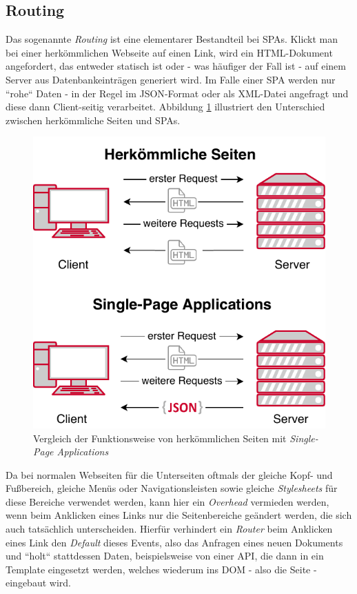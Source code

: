 \subsection{Routing}
\label{sec:technologies:angular:routing}
Das sogenannte \textit{Routing} ist eine elementarer Bestandteil bei \acfp{SPA}. Klickt man bei einer herkömmlichen Webseite auf einen Link, wird ein \acs{HTML}-Dokument angefordert, das entweder statisch ist oder - was häufiger der Fall ist - auf einem Server aus Datenbankeinträgen generiert wird. Im Falle einer \acs{SPA} werden nur ``rohe`` Daten - in der Regel im \acs{JSON}-Format oder als \acs{XML}-Datei angefragt und diese dann Client-seitig verarbeitet.  Abbildung \ref{fig:technologies:spa} illustriert den Unterschied zwischen herkömmliche Seiten und \acsp{SPA}.
\begin{figure}[h]
\centering
	\includegraphics{gfx/SPA}
	\caption[Vergleich der Funktionsweise von herkömmlichen Seiten mit \textit{Single-Page Applications}]{Vergleich der Funktionsweise von herkömmlichen Seiten mit \textit{Single-Page Applications\cite{SPA}}}
	\label{fig:technologies:spa}
\end{figure}
Da bei normalen Webseiten für die Unterseiten oftmals der gleiche Kopf- und Fußbereich, gleiche Menüs oder Navigationsleisten sowie gleiche \textit{Stylesheets} für diese Bereiche verwendet werden, kann hier ein \textit{Overhead} vermieden werden, wenn beim Anklicken eines Links nur die Seitenbereiche geändert werden, die sich auch tatsächlich unterscheiden. Hierfür verhindert ein \textit{Router} beim Anklicken eines Link den \textit{Default} dieses Events, also das Anfragen eines neuen Dokuments und ``holt`` stattdessen Daten, beispielsweise von einer \acs{API}, die dann in ein Template eingesetzt werden, welches wiederum ins \acs{DOM} - also die Seite - eingebaut wird.

